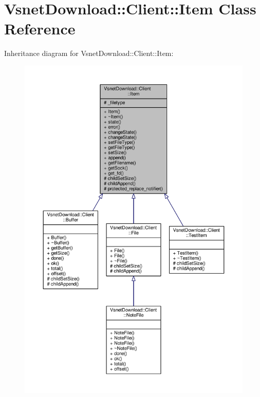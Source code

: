 \hypertarget{classVsnetDownload_1_1Client_1_1Item}{}\section{Vsnet\+Download\+:\+:Client\+:\+:Item Class Reference}
\label{classVsnetDownload_1_1Client_1_1Item}


Inheritance diagram for Vsnet\+Download\+:\+:Client\+:\+:Item\+:
\nopagebreak
\begin{figure}[H]
\begin{center}
\leavevmode
\includegraphics[width=350pt]{d4/d94/classVsnetDownload_1_1Client_1_1Item__inherit__graph}
\end{center}
\end{figure}


